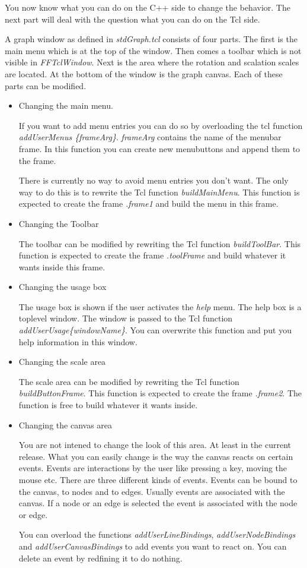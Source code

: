 You now know what you can do on the C++ side to change the
behavior. The next part will deal with the question what you can do on
the Tcl side.

A graph window as defined in {\em stdGraph.tcl} consists of four
parts. The first is the main menu which is at the top of the window.
Then comes a toolbar which is not visible in {\em FFTclWindow}. Next
is the area where the rotation and scalation scales are located. At
the bottom of the window is the graph canvas. Each of these parts can
be modified.

\begin{itemize}

\item Changing the main menu.

If you want to add menu entries you can do so by overloading the tcl
function {\em addUserMenus \{frameArg\}}. {\em frameArg} contains the
name of the menubar frame. In this function you can create new
menubuttons and append them to the frame.

There is currently no way to avoid menu entries you don't want. The
only way to do this is to rewrite the Tcl function {\em
buildMainMenu}. This function is expected to create the frame {\em
.frame1} and build the menu in this frame.

\item Changing the Toolbar

The toolbar can be modified by rewriting the Tcl function {\em
buildToolBar}. This function is expected to create the frame {\em
.toolFrame} and build whatever it wants inside this frame.

\item Changing the usage box

The usage box is shown if the user activates the {\em help} menu. The
help box is a toplevel window. The window is passed to the Tcl function
{\em addUserUsage\{windowName\}}. You can overwrite this function and
put you help information in this window.

\item Changing the scale area

The scale area can be modified by rewriting the Tcl function {\em 
buildButtonFrame}. This function is expected to create the frame {\em
.frame2}. The function is free to build whatever it wants inside.

\item Changing the canvas area

You are not intened to change the look of this area. At least in the
current release. What you can easily change is the way the canvas
reacts on certain events. Events are interactions by the user like
pressing a key, moving the mouse etc. There are three different kinds
of events. Events can be bound to the canvas, to nodes and to edges. 
Usually events are associated with the canvas. If a node or an edge is
selected the event is associated with the node or edge. 

You can overload the functions {\em addUserLineBindings}, {\em
addUserNodeBindings} and {\em addUserCanvasBindings} to add events you
want to react on. You can delete an event by redfining it to do
nothing. 

\end{itemize}
